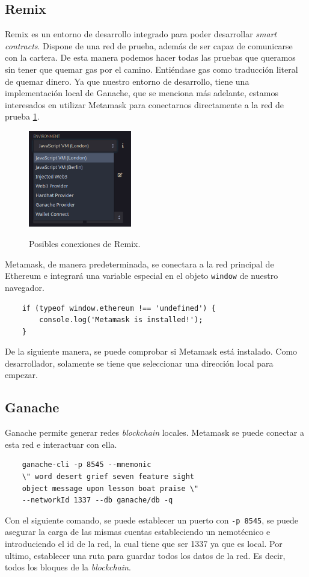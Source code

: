 \subsection{Remix}
Remix es un entorno de desarrollo integrado para poder desarrollar \textit{smart contracts}. Dispone de una red de prueba, además de ser capaz de comunicarse con la cartera. De esta manera podemos hacer todas las pruebas que queramos sin tener que quemar gas por el camino. Entiéndase gas como traducción literal de quemar dinero.
Ya que nuestro entorno de desarrollo, tiene una implementación local de Ganache, que se menciona más adelante, estamos interesados en utilizar Metamask para conectarnos directamente a la red de prueba \ref{fg:remix}.
\begin{figure}[H]
    \centering
    \includegraphics[width=0.4\textwidth]{Figures/remix.png}
    \caption{Posibles conexiones de Remix.}
    \cite{web:remix}
    \label{fg:remix}
\end{figure}
Metamask, de manera predeterminada, se conectara a la red principal de Ethereum e integrará una variable especial en el objeto \verb|window| de nuestro navegador.
\begin{lstlisting}
    if (typeof window.ethereum !== 'undefined') {
        console.log('Metamask is installed!');
    }
\end{lstlisting}
De la siguiente manera, se puede comprobar si Metamask está instalado.
Como desarrollador, solamente se tiene que seleccionar una dirección local para empezar.
\subsection{Ganache}
Ganache permite generar redes \textit{blockchain} locales. Metamask se puede conectar a esta red e interactuar con ella.
\begin{lstlisting}
    ganache-cli -p 8545 --mnemonic 
    \" word desert grief seven feature sight 
    object message upon lesson boat praise \" 
    --networkId 1337 --db ganache/db -q
\end{lstlisting}
Con el siguiente comando, se puede establecer un puerto con \verb|-p 8545|, se puede asegurar la carga de las mismas cuentas estableciendo un nemotécnico e introduciendo el id de la red, la cual tiene que ser 1337 ya que es local. Por ultimo, establecer una ruta para guardar todos los datos de la red. Es decir, todos los bloques de la \textit{blockchain}.

